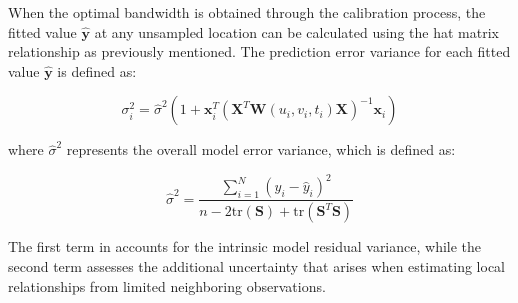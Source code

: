 \label{subsec:gtwr_prediction}

When the optimal bandwidth is obtained through the calibration process, the fitted value $\hat{\mathbf{y}}$ at any unsampled location can be calculated using the hat matrix relationship as previously mentioned. The prediction error variance for each fitted value $\hat{\mathbf{y}}$ is defined as:

\begin{equation}
	\sigma_i^2 = \hat{\sigma}^2 \left(1 + \mathbf{x}_i^T (\mathbf{X}^T \mathbf{W}(u_i, v_i, t_i) \mathbf{X})^{-1} \mathbf{x}_i \right)
	\label{eq:gtwr_variance}
\end{equation}

\noindent where $\hat{\sigma}^2$ represents the overall model error variance, which is defined as:

\begin{equation}
	\hat{\sigma}^2 = \frac{\sum_{i=1}^{N} (y_i - \hat{y}_i)^2}{n - 2\text{tr}(\mathbf{S}) + \text{tr}(\mathbf{S}^T \mathbf{S})}
	\label{eq:model_error_variance}
\end{equation}

The first term in  accounts for the intrinsic model residual variance, while the second term assesses the additional uncertainty that arises when estimating local relationships from limited neighboring observations.


